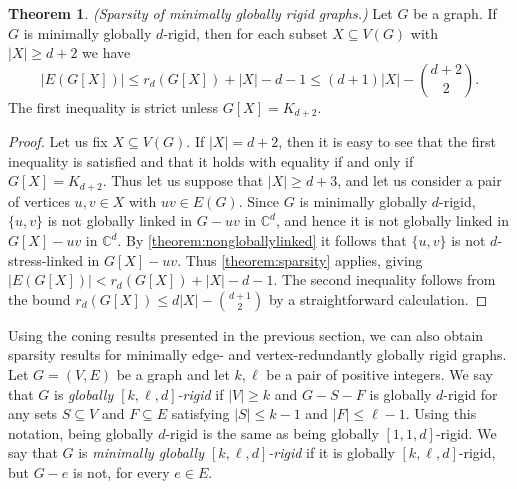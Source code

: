 \documentclass[11pt,a4paper,dvipsnames]{scrartcl}
\theoremstyle{definition}
\newtheorem{theorem}{Theorem}[section]
\newcommand{\CC}{\mathbb{C}}
\newcommand{\globrig}[1]{globally $#1$-rigid}
\newcommand{\strongly}[1]{${#1}$-stress-linked}
\begin{document}
\begin{theorem}\label{corollary:minglobrigid} \emph{(Sparsity of minimally globally rigid graphs.)} \newline
    Let $G$ be a graph. If $G$ is minimally \globrig{d}, then for each subset $X \subseteq V(G)$ with $|X| \geq d+2$ we have \[|E(G[X])| \leq r_d(G[X]) + |X| - d - 1 \leq (d+1)|X| - \binom{d+2}{2}.\] The first inequality is strict unless $G[X] = K_{d+2}$.
\end{theorem}
\begin{proof}
    Let us fix $X \subseteq V(G)$. If $|X| = d+2$, then it is easy to see that the first inequality is satisfied and that it holds with equality if and only if $G[X] = K_{d+2}$. Thus let us suppose that $|X| \geq d+3$, and let us consider a pair of vertices $u,v \in X$ with $uv \in E(G)$. Since $G$ is minimally \globrig{d}, $\{u,v\}$ is not globally linked in $G-uv$ in $\CC^d$, and hence it is not globally linked in $G[X] - uv$ in $\CC^d$. By \cref{theorem:nongloballylinked} it follows that $\{u,v\}$ is not \strongly{d} in $G[X]-uv$. Thus \cref{theorem:sparsity} applies, giving $|E(G[X])| < r_d(G[X]) + |X| - d - 1$. The second inequality follows from the bound $r_d(G[X]) \leq d|X| - \binom{d+1}{2}$ by a straightforward calculation.
\end{proof}

Using the coning results presented in the previous section, we can also obtain sparsity results for minimally edge- and vertex-redundantly globally rigid graphs.
Let $G = (V,E)$ be a graph and let $k,\ell$ be a pair of positive integers. We say that $G$ is \emph{globally $[k,\ell,d]$-rigid} if $|V| \geq k$ and $G - S - F$ is globally $d$-rigid for any sets $S \subseteq V$ and $F \subseteq E$ satisfying $|S| \leq k-1$ and $|F| \leq \ell-1$. Using this notation, being globally $d$-rigid is the same as being globally $[1,1,d]$-rigid.
We say that $G$ is \emph{minimally globally $[k,\ell,d]$-rigid} if it is globally $[k,\ell,d]$-rigid, but $G-e$ is not, for every $e \in E$.
\end{document}

